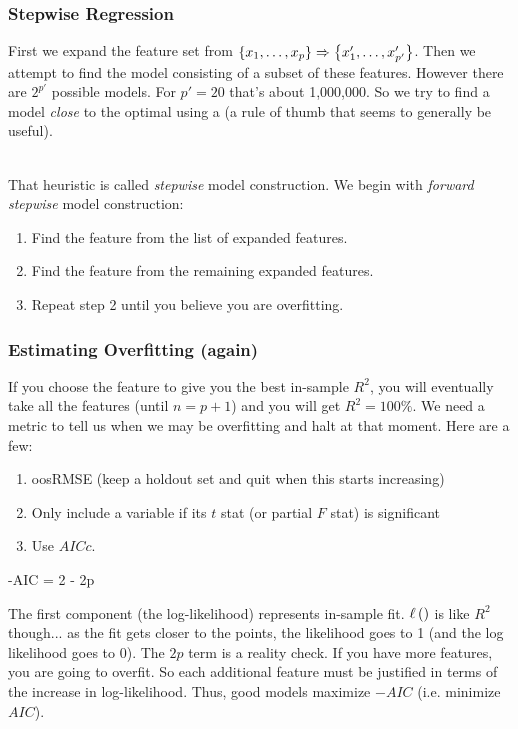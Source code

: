 \documentclass[handout]{beamer}
\begin{document}
\begin{frame}\frametitle{Stepwise Regression}

First we expand the feature set from $\left\{x_1, \ldots, x_p\right\} \Rightarrow \left\{x'_1, \ldots, x'_{p'}\right\}$. \pause Then we attempt to find the  model consisting of a subset of these features. However there are $2^{p'}$ possible models. For $p'=20$ that's about 1,000,000. \pause So we try to find a model \textit{close} to the optimal using a  (a rule of thumb that seems to generally be useful).\\~\\ \pause

That heuristic is called \emph{stepwise} model construction. \pause We begin with \emph{forward stepwise} model construction: \pause

\begin{enumerate}
\item Find the  feature from the list of expanded features.\pause
\item Find the  feature from the remaining expanded features.\pause
\item Repeat step 2 until you believe you are overfitting.\pause
\end{enumerate}




\end{frame}

\begin{frame}\frametitle{Estimating Overfitting (again)}
\small
If you choose the feature to give you the best in-sample $R^2$, you will eventually take all the features (until $n = p+1$) and you will get $R^2 = 100\%$. We need a metric to tell us when we may be overfitting and halt at that moment. \pause Here are a few:

\begin{enumerate}
\item oosRMSE (keep a holdout set and quit when this starts increasing) \pause
\item Only include a variable if its $t$ stat (or partial $F$ stat) is significant \pause
\item Use $AICc$.
\end{enumerate}

\beqn
-AIC = 2\loglik{\betahat; \y, \x} - 2p
\eeqn

The first component (the log-likelihood) represents in-sample fit. \pause $\ell\left(\right)$ is like $R^2$ though... as the fit gets closer to the points, the likelihood goes to 1 (and the log likelihood goes to 0). \pause The $2p$ term is a reality check. If you have more features, you are going to overfit. So each additional feature must be justified in terms of the increase in log-likelihood. \pause Thus, good models maximize $-AIC$ (i.e. minimize $AIC$).\\~\\

\end{frame}
\end{document}
